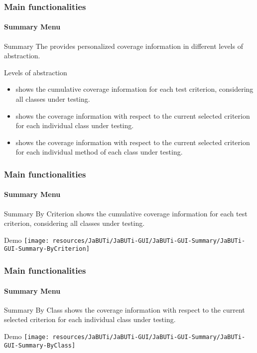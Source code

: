\begin{frame}[parent={cmap:jabuti-gui},hasnext=true,hasprev=true]
\frametitle{Main functionalities}
\framesubtitle{Summary Menu}
\label{concept:summary-menu}

\begin{block}{Summary}
The  provides personalized coverage information in different
levels of abstraction.
\end{block}

\begin{block}{Levels of abstraction}
\begin{itemize}
	\item<2>  shows the cumulative coverage information
	for each test criterion, considering all classes under testing.

	\item<3>  shows the coverage information with respect
	to the current selected criterion for each individual class under testing.

	\item<4>  shows the coverage information with respect
	to the current selected criterion for each individual method of each class
	under testing.
\end{itemize}
\end{block}
\end{frame}



\begin{frame}
\frametitle{Main functionalities}
\framesubtitle{Summary Menu}
\label{concept:summary-by-criterion}

\begin{block}{Summary By Criterion}
 shows the cumulative coverage information
for each test criterion, considering all classes under testing.
\end{block}

\begin{block}{Demo}
\texttt{[image: resources/JaBUTi/JaBUTi-GUI/JaBUTi-GUI-Summary/JaBUTi-GUI-Summary-ByCriterion]}
\end{block}
\end{frame}



\begin{frame}
\frametitle{Main functionalities}
\framesubtitle{Summary Menu}
\label{concept:summary-by-class}

\begin{block}{Summary By Class}
 shows the coverage information with respect
to the current selected criterion for each individual class under testing.
\end{block}

\begin{block}{Demo}
\texttt{[image: resources/JaBUTi/JaBUTi-GUI/JaBUTi-GUI-Summary/JaBUTi-GUI-Summary-ByClass]}
\end{block}
\end{frame}



